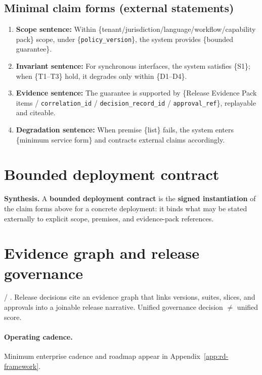 \documentclass[11pt,a4paper]{report}
\begin{document}
\subsection{Minimal claim forms (external statements)}
\begin{enumerate}
  \item \textbf{Scope sentence:} Within \{tenant/jurisdiction/language/workflow/capability pack\} scope, under \{\texttt{policy\_version}\}, the system provides \{bounded guarantee\}.
  \item \textbf{Invariant sentence:} For synchronous interfaces, the system satisfies \{S1\}; when \{T1--T3\} hold, it degrades only within \{D1--D4\}.
  \item \textbf{Evidence sentence:} The guarantee is supported by \{Release Evidence Pack items / \texttt{correlation\_id} / \texttt{decision\_record\_id} / \texttt{approval\_ref}\}, replayable and citeable.
  \item \textbf{Degradation sentence:} When premise \{list\} fails, the system enters \{minimum service form\} and contracts external claims accordingly.
\end{enumerate}

\section{Bounded deployment contract}
\textbf{Synthesis.} A \textbf{bounded deployment contract} is the \textbf{signed instantiation} of the claim forms above for a concrete deployment: it binds what may be stated externally to explicit scope, premises, and evidence-pack references.

\section{Evidence graph and release governance}
\EvalFramework{} / \ControlPlane{}. Release decisions cite an evidence graph that links versions, suites, slices, and approvals into a joinable release narrative. Unified governance decision \(\neq\) unified score.

\paragraph{Operating cadence.} Minimum enterprise cadence and roadmap appear in Appendix~\ref{app:rd-framework}.

\end{document}
